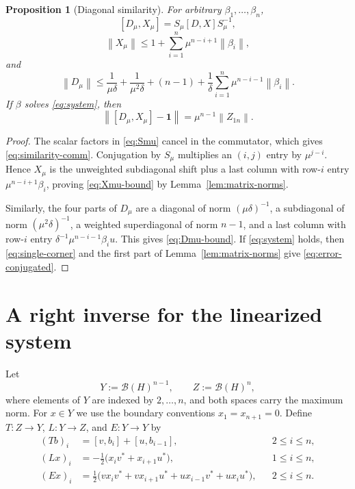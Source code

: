 \documentclass[11pt]{amsart}
\numberwithin{equation}{section}
\newtheorem{proposition}[proposition]{Proposition}
\theoremstyle{remark}
\newcommand{\one}{\mathbf 1}
\newcommand{\norm}[1]{\left\lVert #1\right\rVert}
\begin{document}
\begin{proposition}[Diagonal similarity]\label{prop:similarity}
For arbitrary $\beta_1,\ldots,\beta_n$,
\begin{equation}\label{eq:similarity-comm}
 [D_\mu,X_\mu]=S_\mu[D,X]S_\mu^{-1},
\end{equation}
\begin{equation}\label{eq:Xmu-bound}
 \norm{X_\mu}
 \leq1+\sum_{i=1}^n\mu^{n-i+1}\norm{\beta_i},
\end{equation}
and
\begin{equation}\label{eq:Dmu-bound}
 \norm{D_\mu}
 \leq\frac1{\mu\delta}+\frac1{\mu^2\delta}+(n-1)
 +\frac1\delta\sum_{i=1}^n\mu^{n-i-1}\norm{\beta_i}.
\end{equation}
If $\beta$ solves \eqref{eq:system}, then
\begin{equation}\label{eq:error-conjugated}
 \norm{[D_\mu,X_\mu]-\one}
 =\mu^{n-1}\norm{Z_{1n}}.
\end{equation}
\end{proposition}

\begin{proof}
The scalar factors in \eqref{eq:Smu} cancel in the commutator, which gives
\eqref{eq:similarity-comm}.  Conjugation by $S_\mu$ multiplies an $(i,j)$
entry by $\mu^{j-i}$.  Hence $X_\mu$ is the unweighted subdiagonal shift plus
a last column with row-$i$ entry $\mu^{n-i+1}\beta_i$, proving
\eqref{eq:Xmu-bound} by Lemma~\ref{lem:matrix-norms}.

Similarly, the four parts of $D_\mu$ are a diagonal of norm
$(\mu\delta)^{-1}$, a subdiagonal of norm $(\mu^2\delta)^{-1}$, a weighted
superdiagonal of norm $n-1$, and a last column with row-$i$ entry
$\delta^{-1}\mu^{n-i-1}\beta_i u$.  This gives
\eqref{eq:Dmu-bound}.  If \eqref{eq:system} holds, then
\eqref{eq:single-corner} and the first part of Lemma~\ref{lem:matrix-norms} give
\eqref{eq:error-conjugated}.
\end{proof}

\section{A right inverse for the linearized system}

Let
\[
 Y:=\mathcal B(H)^{n-1},\qquad
 Z:=\mathcal B(H)^n,
\]
where elements of $Y$ are indexed by $2,\ldots,n$, and both spaces carry the
maximum norm.  For $x\in Y$ we use the boundary conventions
$x_1=x_{n+1}=0$.  Define $T:Z\to Y$, $L:Y\to Z$, and $E:Y\to Y$ by
\begin{align}
 (Tb)_i&=[v,b_i]+[u,b_{i-1}],
 &&2\leq i\leq n,
 \label{eq:T-def}\\
 (Lx)_i&=-\frac12\bigl(x_i v^*+x_{i+1}u^*\bigr),
 &&1\leq i\leq n,
 \label{eq:L-def}\\
 (Ex)_i&=\frac12\bigl(vx_iv^*+vx_{i+1}u^*
 +ux_{i-1}v^*+ux_iu^*\bigr),
 &&2\leq i\leq n.
 \label{eq:E-def}
\end{align}
\end{document}
